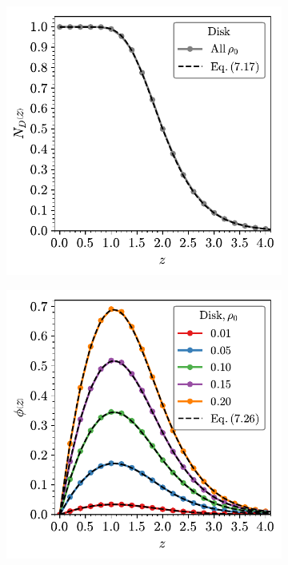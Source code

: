 \begin{figure}
     \vspace{2mm}
     \begin{subfigure}[b]{0.45\textwidth}
         \centering
         \includegraphics[width=\textwidth]{./figures/quasi2d/n_z_3d_disk.pdf}
         \caption{}
         \label{fig:nphic}
     \end{subfigure}
     \hfill
      \begin{subfigure}[b]{0.45\textwidth}
         \centering
         \includegraphics[width=\textwidth]{./figures/quasi2d/phi_z_2d.pdf}
         \caption{}
         \label{fig:nphid}
     \end{subfigure}
     \hfill
     

\end{figure}
